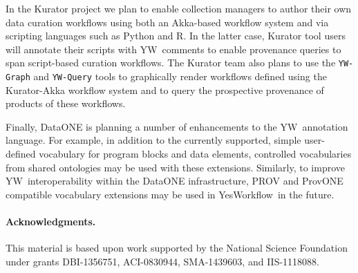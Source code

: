 \documentclass[15]{ijdc-v9}
\newcommand{\YW}{\textsf{YesWorkflow}}
\newcommand{\yw}{\textsf{YW}}
\newcommand{\ywm}[1]{\texttt{\small #1}}
\newcommand{\R}{R}
\begin{document}
In the Kurator project \cite{kuratorproject} we plan to enable
collection managers to author their own data curation workflows using
both an Akka-based workflow system and via scripting languages such as
Python and \R. In the latter case, Kurator tool users will annotate
their scripts with \yw\ comments to enable provenance queries to span
script-based curation workflows.
The Kurator team also plans to use the \ywm{YW-Graph} and
\ywm{YW-Query} tools to graphically render workflows defined using the
Kurator-Akka workflow system and to query the prospective provenance
of products of these workflows.

Finally, DataONE is planning a number of enhancements to the \yw\
annotation language. For example, in addition to the currently
supported, simple user-defined vocabulary for program blocks and data
elements, controlled vocabularies from shared ontologies may be used
with these extensions. Similarly, to improve \yw\ interoperability
within the DataONE infrastructure, PROV \cite{moreau2013prov} and
ProvONE \cite{dataone2014provone} compatible vocabulary extensions
may be used in \YW\ in the future.

\paragraph{Acknowledgments.} This material is based upon work
supported by the National Science Foundation under grants DBI-1356751,
ACI-0830944, SMA-1439603, and IIS-1118088.


\setcounter{secnumdepth}{0}

\end{document}
